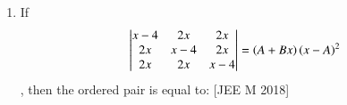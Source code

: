 \documentclass[journal,,12pt,twocolumn]{IEEEtran}
\theoremstyle{remark}
\begin{document}
\begin{enumerate}
\begin{enumerate}
\end{enumerate} 
\item If \begin{align*} \begin{vmatrix}
x-4 & 2x  & 2x\\
2x & x-4 & 2x \\
 2x & 2x & x-4 
\end{vmatrix} =\left(A+Bx\right)\left(x-A\right)^2\end{align*}, then the ordered pair  is equal to: 
\hfill{[JEE M 2018]}
\begin{enumerate}
\end{enumerate}
\end{enumerate}
\end{document}
